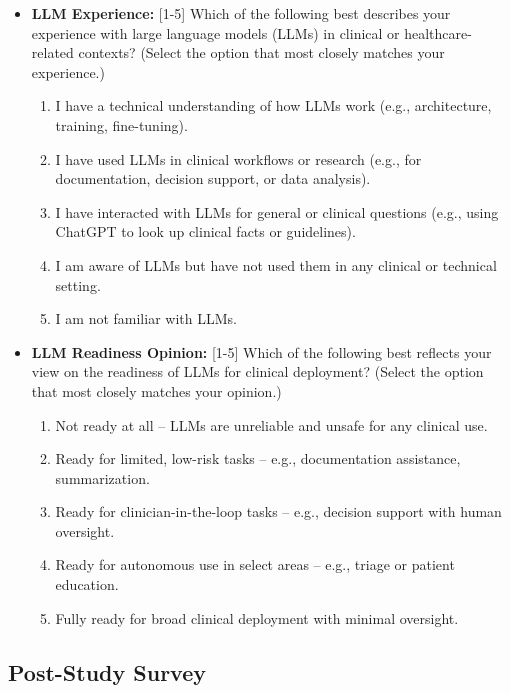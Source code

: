 \documentclass[11pt]{article}
\begin{document}
\begin{tcolorbox}[palebluebox]
\begin{itemize}
    \vspace{2mm}
    
    \item \textbf{LLM Experience:} [1-5] Which of the following best describes your experience with large language models (LLMs) in clinical or healthcare-related contexts? (Select the option that most closely matches your experience.)
    \begin{enumerate}
        \item I have a technical understanding of how LLMs work (e.g., architecture, training, fine-tuning).
        \item I have used LLMs in clinical workflows or research (e.g., for documentation, decision support, or data analysis).
        \item I have interacted with LLMs for general or clinical questions (e.g., using ChatGPT to look up clinical facts or guidelines).
        \item I am aware of LLMs but have not used them in any clinical or technical setting.
        \item I am not familiar with LLMs.
    \end{enumerate}
    
    \vspace{2mm}
    
    \item \textbf{LLM Readiness Opinion:} [1-5] Which of the following best reflects your view on the readiness of LLMs for clinical deployment? (Select the option that most closely matches your opinion.)
    \begin{enumerate}
        \item Not ready at all – LLMs are unreliable and unsafe for any clinical use.
        \item Ready for limited, low-risk tasks – e.g., documentation assistance, summarization.
        \item Ready for clinician-in-the-loop tasks – e.g., decision support with human oversight.
        \item Ready for autonomous use in select areas – e.g., triage or patient education.
        \item Fully ready for broad clinical deployment with minimal oversight.
    \end{enumerate}
\end{itemize}

\end{tcolorbox}

\subsection{Post-Study Survey}
\end{document}
